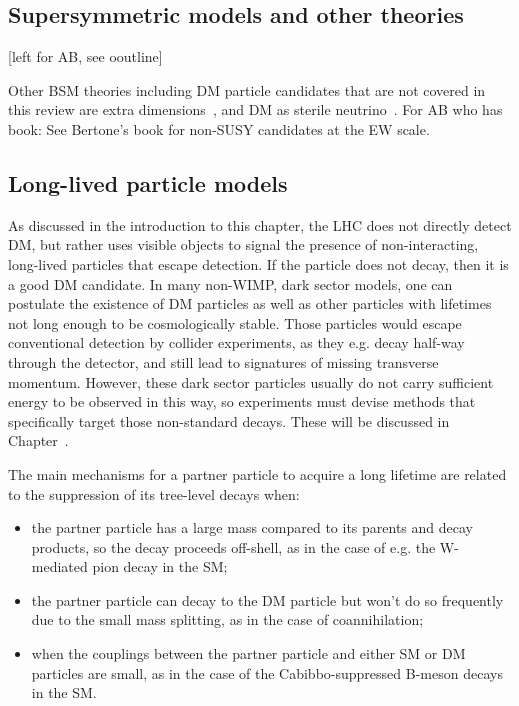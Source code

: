 
\subsection{Supersymmetric models and other theories}
\label{sec:SUSYModels}

[left for AB, see ooutline]

Other BSM theories including DM particle candidates that are not covered in this review are extra dimensions~\cite{Hooper:2007qk}, and DM as sterile neutrino~\cite{Adhikari:2016bei}. For AB who has book: See Bertone's book for non-SUSY candidates at the EW scale. 

\subsection{Long-lived particle models}
\label{sec:LLPModels}


As discussed in the introduction to this chapter, the LHC does not directly detect DM, but rather uses visible objects to signal the presence of non-interacting, long-lived particles that escape detection. If the particle does not decay, then it is a good DM candidate. In many non-WIMP, dark sector models, one can postulate the existence of DM particles as well as other particles with lifetimes not long enough to be cosmologically stable. Those particles would escape conventional detection by collider experiments, as they e.g. decay half-way through the detector, and still lead to signatures of missing transverse momentum. 
However, these dark sector particles usually do not carry sufficient energy to be observed in this way, so experiments must devise methods that specifically target those non-standard decays. These will be discussed in Chapter~\cite{sec:05_Future}.

The main mechanisms for a partner particle to acquire a long lifetime are related to the suppression of its tree-level decays when:
\begin{itemize}
\item the partner particle has a large mass compared to its parents and decay products, so the decay proceeds off-shell, as in the case of e.g. the W-mediated pion decay in the SM;
\item the partner particle can decay to the DM particle but won't do so frequently due to the small mass splitting, as in the case of coannihilation;
\item when the couplings between the partner particle and either SM or DM particles are small, as in the case  of the Cabibbo-suppressed B-meson decays in the SM. 
\end{itemize}

